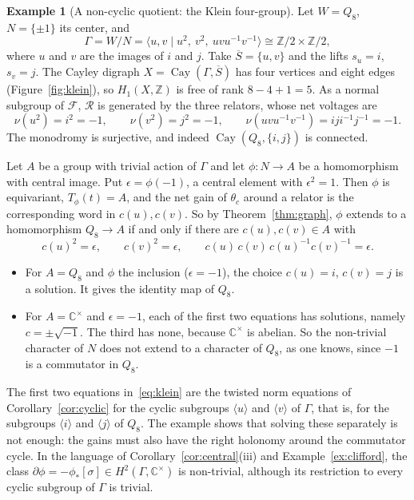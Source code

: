 \documentclass[12pt,letterpaper]{article}
\numberwithin{equation}{section}
\theoremstyle{plain}
\theoremstyle{definition}
\newtheorem{example}[theorem]{Example}
\newcommand{\Z}{\mathbb{Z}}
\newcommand{\C}{\mathbb{C}}
\newcommand{\fr}{\mathcal{F}}             %
\newcommand{\rel}{\mathcal{R}}            %
\DeclareMathOperator{\Cay}{Cay}
\begin{document}
\begin{example}[A non-cyclic quotient: the Klein four-group]\label{ex:klein}
Let $W=Q_8$, $N=\{\pm1\}$ its center, and
\[
\Gamma=W/N=\langle u,v\mid u^2,\ v^2,\ uvu^{-1}v^{-1}\rangle\cong
\Z/2\times\Z/2,
\]
where $u$ and $v$ are the images of $i$ and $j$. Take
$\overline{S}=\{u,v\}$ and the lifts $s_u=i$, $s_v=j$. The Cayley digraph
$X=\Cay(\Gamma,\overline{S})$ has four vertices and eight edges
(Figure~\ref{fig:klein}), so $H_1(X,\Z)$ is free of rank $8-4+1=5$. As a
normal subgroup of $\fr$, $\rel$ is generated by the three relators, whose
net voltages are
\[
\nu(u^2)=i^2=-1,\qquad\nu(v^2)=j^2=-1,\qquad
\nu(uvu^{-1}v^{-1})=iji^{-1}j^{-1}=-1 .
\]
The monodromy is surjective, and indeed $\Cay(Q_8,\{i,j\})$ is connected.

Let $A$ be a group with trivial action of $\Gamma$ and let
$\phi:N\to A$ be a homomorphism with central image. Put
$\epsilon=\phi(-1)$, a central element with $\epsilon^2=1$. Then $\phi$ is
equivariant, $T_\phi(t)=A$, and the net gain of $\theta_c$ around a
relator is the corresponding word in $c(u),c(v)$. So by
Theorem~\ref{thm:graph}, $\phi$ extends to a homomorphism $Q_8\to A$ if
and only if there are $c(u),c(v)\in A$ with
\begin{equation}\label{eq:klein}
c(u)^2=\epsilon,\qquad c(v)^2=\epsilon,\qquad
c(u)\,c(v)\,c(u)^{-1}c(v)^{-1}=\epsilon .
\end{equation}
\begin{itemize}[itemsep=1pt]
\item For $A=Q_8$ and $\phi$ the inclusion ($\epsilon=-1$), the choice
$c(u)=i$, $c(v)=j$ is a solution. It gives the identity map of $Q_8$.
\item For $A=\C^\times$ and $\epsilon=-1$, each of the first two equations
has solutions, namely $c=\pm\sqrt{-1}$. The third has none, because
$\C^\times$ is abelian. So the non-trivial character of $N$ does not
extend to a character of $Q_8$, as one knows, since $-1$ is a commutator
in $Q_8$.
\end{itemize}
The first two equations in~\eqref{eq:klein} are the twisted norm equations
of Corollary~\ref{cor:cyclic} for the cyclic subgroups $\langle u\rangle$
and $\langle v\rangle$ of $\Gamma$, that is, for the subgroups
$\langle i\rangle$ and $\langle j\rangle$ of $Q_8$. The example shows
that solving these separately is not enough: the gains must also have the
right holonomy around the commutator cycle. In the language of
Corollary~\ref{cor:central}(iii) and Example~\ref{ex:clifford}, the class
$\partial\phi=-\phi_*[\sigma]\in H^2(\Gamma,\C^\times)$ is non-trivial,
although its restriction to every cyclic subgroup of $\Gamma$ is trivial.
\end{example}
\end{document}
